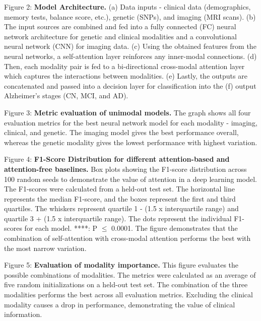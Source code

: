\documentclass[11pt]{article}
\begin{document}
\noindent Figure 2: \textbf{Model Architecture.} (a) Data inputs - clinical data (demographics, memory tests, balance score, etc.), genetic (SNPs), and imaging (MRI scans). (b) The input sources are combined and fed into a fully connected (FC) neural network architecture for genetic and clinical modalities and a convolutional neural network (CNN) for imaging data. (c) Using the obtained features from the neural networks, a self-attention layer reinforces any inner-modal connections. (d) Then, each modality pair is fed to a bi-directional cross-modal attention layer which captures the interactions between modalities. (e) Lastly, the outputs are concatenated and passed into a decision layer for classification into the (f) output Alzheimer’s stages (CN, MCI, and AD).\newline

\noindent Figure 3: \textbf{Metric evaluation of unimodal models.} The graph shows all four evaluation metrics for the best neural network model for each modality - imaging, clinical, and genetic. The imaging model gives the best performance overall, whereas the genetic modality gives the lowest performance with highest variation.\newline

\noindent Figure 4: \textbf{F1-Score Distribution for different attention-based and attention-free baselines.} Box plots showing the F1-score distribution across 100 random seeds to demonstrate the value of attention in a deep learning model. The F1-scores were calculated from a held-out test set. The horizontal line represents the median F1-score, and the boxes represent the first and third quartiles. The whiskers represent quartile 1 - (1.5 x interquartile range) and quartile 3 + (1.5 x interquartile range). The dots represent the individual F1-scores for each model. ****: P $\le$ 0.0001. The figure demonstrates that the combination of self-attention with cross-modal attention performs the best with the most narrow variation. \newline

\noindent Figure 5: \textbf{Evaluation of modality importance.} This figure evaluates the possible combinations of modalities. The metrics were calculated as an average of five random initializations on a held-out test set. The combination of the three modalities performs the best across all evaluation metrics. Excluding the clinical modality causes a drop in performance, demonstrating the value of clinical information.
\end{document}
